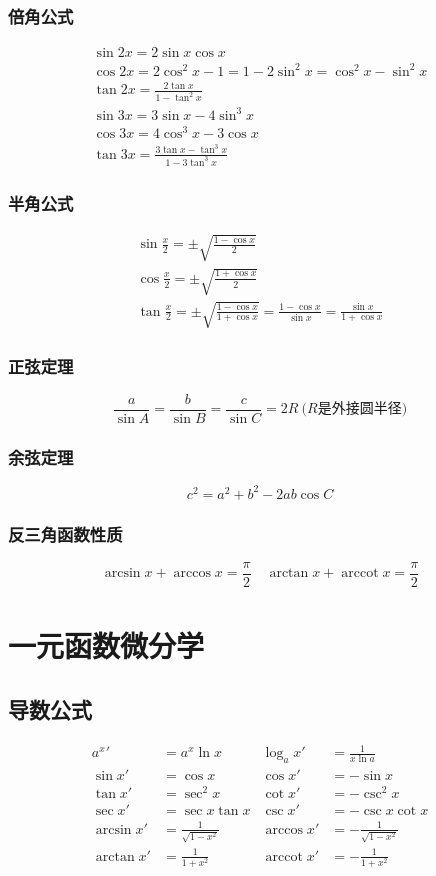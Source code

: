 \subsubsection{倍角公式}
\begin{gather*}
\sin 2x=2\sin x\cos x\\
\cos 2x=2\cos^2 x-1=1-2\sin^2 x=\cos^2 x-\sin^2 x\\
\tan 2x=\frac{2\tan x}{1-\tan^2 x}\\
\sin 3x=3\sin x-4\sin^3 x\\
\cos 3x=4\cos^3 x-3\cos x\\
\tan 3x=\frac{3\tan x-\tan^3 x}{1-3\tan^3 x}
\end{gather*}
\subsubsection{半角公式}
\begin{gather*}
    \sin\frac x2=\pm\sqrt{\frac{1-\cos x}{2}}\\
\cos\frac x2=\pm\sqrt{\frac{1+\cos x}{2}}\\
\tan\frac x2=\pm\sqrt{\frac{1-\cos x}{1+\cos x}}=\frac{1-\cos x}{\sin x}=\frac{\sin x}{1+\cos x}
\end{gather*}
\subsubsection{正弦定理}
\[\frac{a}{\sin A}=\frac{b}{\sin B}=\frac{c}{\sin C}=2R\ \text{($R$是外接圆半径)}\]
\subsubsection{余弦定理}
\[c^2=a^2+b^2-2ab\cos C\]
\subsubsection{反三角函数性质}
\[\arcsin x+\arccos x=\frac \pi2 \quad \arctan x+\operatorname{arccot} x=\frac \pi2\]
\section{一元函数微分学}
\subsection{导数公式}
\begin{align*}
a^x{'}&=a^x\ln x & \log_a x'&=\frac{1}{x\ln a}\\
\sin x'&=\cos x   & \cos x'&=-\sin x \\
\tan x'&=\sec^2x  & \cot x'&=-\csc^2x\\
\sec x'&=\sec x\tan x & \csc x'&=-\csc x\cot x\\
\arcsin x' &=\frac{1}{\sqrt{1-x^2}}& \arccos x' &=-\frac{1}{\sqrt{1-x^2}}\\
\arctan x' &=\frac{1}{1+x^2}&\operatorname{arccot}x'&=-\frac{1}{1+x^2}
\end{align*}
